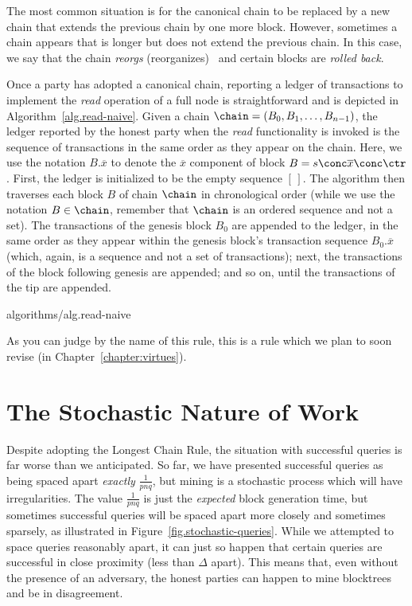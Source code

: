 The most common situation is for the canonical chain to be replaced by a new chain
that extends the previous chain by one more block. However, sometimes a chain appears
that is longer but does not extend the previous chain. In this case, we say that
the chain \emph{reorgs} (reorganizes)~ and certain blocks are \emph{rolled
back}.

Once a party has adopted a canonical chain, reporting a ledger of transactions
to implement the \emph{read} operation of a full node is straightforward and
is depicted in Algorithm~\ref{alg.read-naive}. Given a chain
$\chain = (B_0, B_1, \ldots, B_{n-1})$, the ledger reported by the honest
party when the \emph{read} functionality is invoked is the sequence of
transactions in the same order as they appear on the chain.
Here, we use the notation $B.\overline{x}$ to denote the $\overline{x}$ component
of block $B = s \conc \overline{x} \conc \ctr$.
First, the ledger is initialized to be the empty sequence $[\,]$. The algorithm
then traverses each block $B$ of chain $\chain$ in chronological order (while we
use the notation $B \in \chain$, remember that $\chain$ is an ordered sequence
and not a set). The transactions of the genesis block $B_0$ are appended to the ledger, in the same
order as they appear within the genesis block's transaction sequence $B_0.\overline{x}$
(which, again, is a sequence and not a set of transactions);
next, the transactions of the block following genesis are appended; and so on, until
the transactions of the tip are appended.

{algorithms/alg.read-naive}

As you can judge by the name of this rule, this is a rule which we plan to
soon revise (in Chapter~\ref{chapter:virtues}).

\section{The Stochastic Nature of Work}

Despite adopting the Longest Chain Rule, the situation with successful queries
is far worse than we anticipated.
So far, we have presented successful queries as being
spaced apart \emph{exactly} $\frac{1}{pnq}$, but mining is a stochastic process which will have
irregularities. The value $\frac{1}{pnq}$ is just the \emph{expected} block generation time, but
sometimes successful queries will be spaced apart more closely and sometimes sparsely, as illustrated
in Figure~\ref{fig.stochastic-queries}. While we attempted to space queries reasonably apart, it can
just so happen that certain queries are successful in close proximity (less than $\Delta$ apart).
This means that, even without the presence of an adversary, the honest parties can happen to
mine blocktrees and be in disagreement.

